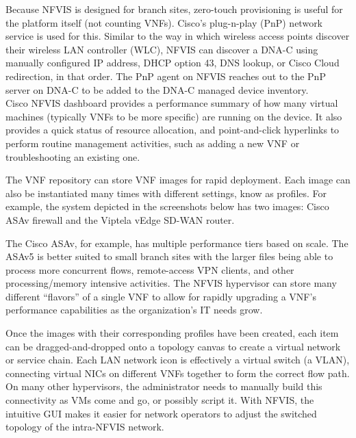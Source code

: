 Because NFVIS is designed for branch sites, zero-touch provisioning is useful
for the platform itself (not counting VNFs). Cisco's plug-n-play (PnP) network
service is used for this. Similar to the way in which wireless access points
discover their wireless LAN controller (WLC), NFVIS can discover a DNA-C using
manually configured IP address, DHCP option 43, DNS lookup, or Cisco Cloud
redirection, in that order. The PnP agent on NFVIS reaches out to the PnP
server on DNA-C to be added to the DNA-C managed device inventory. \\

Cisco NFVIS dashboard provides a performance summary of how many virtual machines
(typically VNFs to be more specific) are running on the device. It also
provides a quick status of resource allocation, and point-and-click hyperlinks
to perform routine management activities, such as adding a new VNF or
troubleshooting an existing one.


The VNF repository can store VNF images for rapid deployment. Each image can
also be instantiated many times with different settings, know as profiles. For
example, the system depicted in the screenshots below has two images: Cisco
ASAv firewall and the Viptela vEdge SD-WAN router.


The Cisco ASAv, for example, has multiple performance tiers based on scale.
The ASAv5 is better suited to small branch sites with the larger files being
able to process more concurrent flows, remote-access VPN clients, and other
processing/memory intensive activities. The NFVIS hypervisor can store many
different ``flavors'' of a single VNF to allow for rapidly upgrading a VNF's
performance capabilities as the organization's IT needs grow.


Once the images with their corresponding profiles have been created, each item
can be dragged-and-dropped onto a topology canvas to create a virtual network
or service chain. Each LAN network icon is effectively a virtual switch (a
VLAN), connecting virtual NICs on different VNFs together to form the correct
flow path. On many other hypervisors, the administrator needs to manually
build this connectivity as VMs come and go, or possibly script it. With NFVIS,
the intuitive GUI makes it easier for network operators to adjust the switched
topology of the intra-NFVIS network. \\

